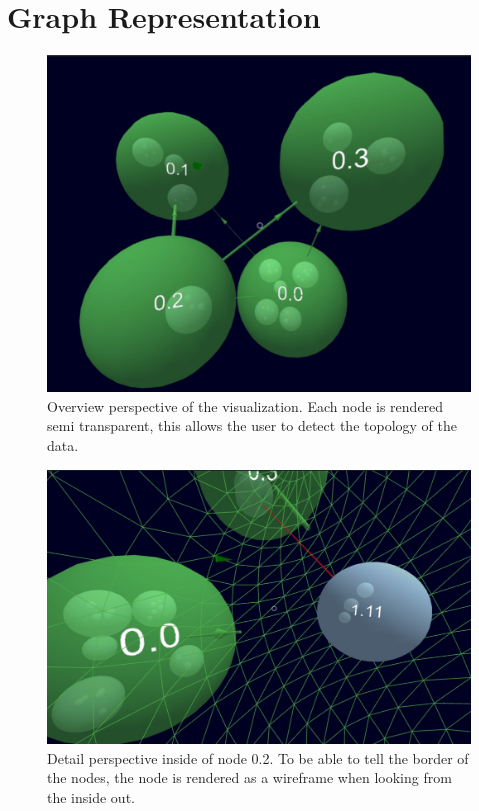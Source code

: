 \section{Graph Representation}
\label{chap:ps-graphRepresentation}
\begin{figure}[!htb]
    \centering
    \includegraphics[width=1\textwidth]{graphics/screenshotNesting.jpg}
    \caption[Screenshot of the visualization.]{Overview perspective of the visualization. Each node is rendered semi transparent, this allows the user to detect the topology of the data.}
    \label{fig:ps_nestedLayout}
\end{figure}
\begin{figure}[!htb]
    \centering
    \includegraphics[width=1\textwidth]{graphics/screenshotNestingAndWireframe.jpg}
    \caption[Screenshot of the visualization.]{Detail perspective inside of node 0.2. To be able to tell the border of the nodes, the node is rendered as a wireframe when looking from the inside out.}
    \label{fig:ps_wireframe}
\end{figure}
